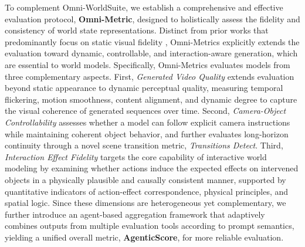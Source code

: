 To complement Omni-WorldSuite, we establish a comprehensive and effective evaluation protocol, \textbf{Omni-Metric}, designed to holistically assess the fidelity and consistency of world state representations. Distinct from prior works that predominantly focus on static visual fidelity \cite{duan2025worldscore, huang2024vbench++}, Omni-Metrics explicitly extends the evaluation toward dynamic, controllable, and interaction-aware generation, which are essential to world models. Specifically, Omni-Metrics evaluates models from three complementary aspects. First, \textit{Generated Video Quality} extends evaluation beyond static appearance to dynamic perceptual quality, measuring temporal flickering, motion smoothness, content alignment, and dynamic degree to capture the visual coherence of generated sequences over time. Second, \textit{Camera-Object Controllability} assesses whether a model can follow explicit camera instructions while maintaining coherent object behavior, and further evaluates long-horizon continuity through a novel scene transition metric, \textit{Transitions Detect}. Third, \textit{Interaction Effect Fidelity} targets the core capability of interactive world modeling by examining whether actions induce the expected effects on intervened objects in a physically plausible and causally consistent manner, supported by quantitative indicators of action-effect correspondence, physical principles, and spatial logic. Since these dimensions are heterogeneous yet complementary, we further introduce an agent-based aggregation framework that adaptively combines outputs from multiple evaluation tools according to prompt semantics, yielding a unified overall metric, \textbf{AgenticScore}, for more reliable evaluation.



